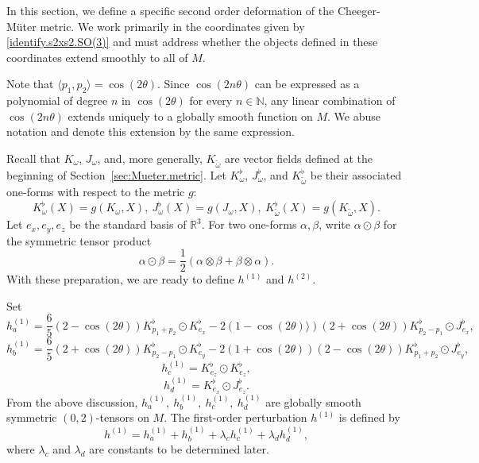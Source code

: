 \documentclass[11pt]{amsart}
\theoremstyle{definition}
\begin{document}
\label{second.order.deformation}

In this section, we define a specific second order deformation of the Cheeger-M\"uter metric.
We work primarily in the coordinates given by \eqref{identify.s2xs2.SO(3)} and must address whether the objects defined in these coordinates extend smoothly to all of $M$.

Note that $\langle p_1,p_2\rangle=\cos(2\theta)$.
Since $\cos(2n\theta)$ can be expressed as a polynomial of degree $n$ in $\cos(2\theta)$ for every $n\in\mathbb{N}$, any linear combination of $\cos(2n\theta)$ extends uniquely to a globally smooth function on $M$.
We abuse notation and denote this extension by the same expression.

Recall that $K_\omega$, $J_\omega$, and, more generally, $K_{\tilde{\omega}}$ are vector fields defined at the beginning of Section~\ref{sec:Mueter.metric}.
Let $K^\flat_\omega$, $J^\flat_\omega$, and $K^\flat_{\tilde{\omega}}$ be their associated one-forms with respect to the metric $g$:
\[
K^\flat_\omega(X)=g(K_\omega,X),\ J^\flat_\omega(X)=g(J_\omega,X),\ K^\flat_{\tilde{\omega}}(X)=g(K_{\tilde{\omega}},X).
\]
Let $e_x, e_y, e_z$ be the standard basis of $\mathbb{R}^3$.
For two one-forms $\alpha,\beta$, write $\alpha\odot \beta$ for the symmetric tensor product
\[
\alpha\odot\beta=\frac{1}{2}(\alpha\otimes \beta+\beta\otimes \alpha).
\]
With these preparation, we are ready to define $h^{(1)}$ and $h^{(2)}$.

Set
\begin{equation*}\label{def.ha}
h^{(1)}_a=\frac{6}{5} (2- \cos(2\theta) ) K^\flat_{p_1+p_2}\odot K^\flat_{e_x}-2(1-\cos(2\theta) \rangle)(2+\cos(2\theta)) K^\flat_{p_2-p_1}\odot J^\flat_{e_x},
\end{equation*}
\begin{equation*}\label{def.hb}
h^{(1)}_b=\frac{6}{5} (2+\cos(2\theta)) K^\flat_{p_2-p_1}\odot K^\flat_{e_y}-2(1+\cos(2\theta))(2-\cos(2\theta)) K^\flat_{p_1+p_2}\odot J^\flat_{e_y},
\end{equation*}
\begin{equation*}\label{def.hc}
h^{(1)}_c= K^\flat_{e_z}\odot K^\flat_{e_z},
\end{equation*}
\begin{equation*}\label{def.hd}
h^{(1)}_d= K^\flat_{e_x}\odot J^\flat_{e_z}.
\end{equation*}
From the above discussion, $h^{(1)}_a,\ h^{(1)}_b,\ h^{(1)}_c,\ h^{(1)}_d$ are globally smooth symmetric $(0,2)$-tensors on $M$.
The first-order perturbation $h^{(1)}$ is defined by
\begin{equation}\label{def.h1}
h^{(1)}=h^{(1)}_a+h^{(1)}_b+\lambda_c h^{(1)}_c+\lambda_d h^{(1)}_d,
\end{equation}
where $\lambda_c$ and $\lambda_d$ are constants to be determined later.
\end{document}
